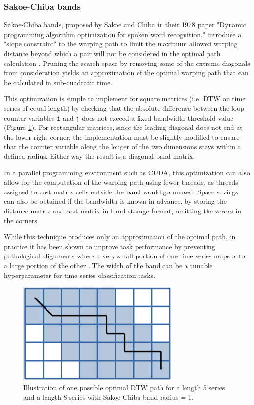 \documentclass[12pt, letterpaper]{article}
\begin{document}
\subsubsection{Sakoe-Chiba bands}

Sakoe-Chiba bands, proposed by Sakoe and Chiba in their 1978 paper "Dynamic
programming algorithm optimization for spoken word recognition," introduce a
"slope constraint" to the warping path to limit the maximum allowed warping
distance beyond which a pair will not be considered in the optimal path
calculation \cite{sakoe_dynamic_1978}. Pruning the search space by removing some
of the extreme diagonals from consideration yields an approximation of the
optimal warping path that can be calculated in sub-quadratic time.

This optimization is simple to implement for square matrices (i.e. DTW on time
series of equal length) by checking that the absolute difference between the
loop counter variables \verb|i| and \verb|j| does not exceed a fixed bandwidth
threshold value (Figure \ref{sakoe_chiba}). For rectangular matrices, since the
leading diagonal does not end at the lower right corner, the implementation must
be slightly modified to ensure that the counter variable along the longer of the
two dimensions stays within a defined radius. Either way the result is a
diagonal band matrix.

In a parallel programming environment such as CUDA, this optimization can also
allow for the computation of the warping path using fewer threads, as threads
assigned to cost matrix cells outside the band would go unused. Space savings
can also be obtained if the bandwidth is known in advance, by storing the
distance matrix and cost matrix in band storage format, omitting the zeroes
in the corners.

While this technique produces only an approximation of the optimal path, in
practice it has been shown to improve task performance by preventing
pathological alignments where a very small portion of one time series maps onto
a large portion of the other \cite{keogh_exact_2002}. The width of the band
can be a tunable hyperparameter for time series classification tasks.

\begin{figure}[htbp]
\includegraphics[height=2in]{img/sakoe_chiba.png}
\centering
\caption{Illustration of one possible optimal DTW path for a length 5 series and
a length 8 series with Sakoe-Chiba band radius = 1.}
\label{sakoe_chiba}
\end{figure}
\end{document}
